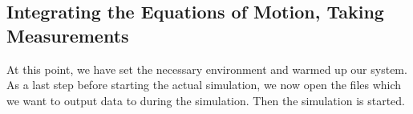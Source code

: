 \documentclass[
paper=a4,                       %
fontsize=11pt,                  %
twoside,                        %
footsepline,                    %
headsepline,                    %
headinclude=false,              %
footinclude=false,              %
pagesize,                       %
]{scrartcl}
\begin{document}
{%
%
%
%
%
%
%
%
%
%
%
%

\subsection{Integrating the Equations of Motion, Taking Measurements}
\noindent At this point, we have set the necessary environment and warmed up our system. As a last
step before starting the actual simulation, we now open the files which we want to output data to
during the simulation. Then the simulation is started.

}
\end{document}
